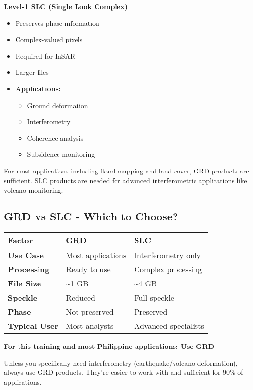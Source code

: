 \documentclass[
  letterpaper,
  DIV=11,
  numbers=noendperiod]{scrartcl}
\providecommand{\tightlist}{%
  \setlength{\itemsep}{0pt}\setlength{\parskip}{0pt}}
\begin{document}
\textbf{Level-1 SLC (Single Look Complex)}

\begin{itemize}
\tightlist
\item
  Preserves phase information
\item
  Complex-valued pixels
\item
  Required for InSAR
\item
  Larger files
\item
  \textbf{Applications:}

  \begin{itemize}
  \tightlist
  \item
    Ground deformation
  \item
    Interferometry
  \item
    Coherence analysis
  \item
    Subsidence monitoring
  \end{itemize}
\end{itemize}

For most applications including flood mapping and land cover, GRD
products are sufficient. SLC products are needed for advanced
interferometric applications like volcano monitoring.

\subsection{GRD vs SLC - Which to
Choose?}\label{grd-vs-slc---which-to-choose}

\begin{longtable}[]{@{}lll@{}}
\toprule\noalign{}
\textbf{Factor} & \textbf{GRD} & \textbf{SLC} \\
\midrule\noalign{}
\endhead
\bottomrule\noalign{}
\endlastfoot
\textbf{Use Case} & Most applications & Interferometry only \\
\textbf{Processing} & Ready to use & Complex processing \\
\textbf{File Size} & \textasciitilde1 GB & \textasciitilde4 GB \\
\textbf{Speckle} & Reduced & Full speckle \\
\textbf{Phase} & Not preserved & Preserved \\
\textbf{Typical User} & Most analysts & Advanced specialists \\
\end{longtable}

\textbf{For this training and most Philippine applications: Use GRD}

Unless you specifically need interferometry (earthquake/volcano
deformation), always use GRD products. They're easier to work with and
sufficient for 90\% of applications.
\end{document}
